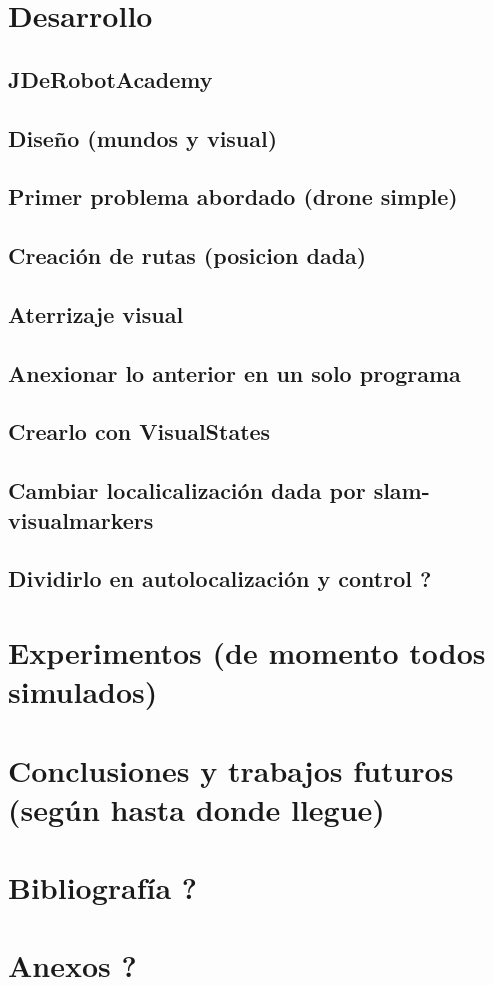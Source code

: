 \documentclass{book}
\begin{document}
\chapter{Desarrollo}
\section{JDeRobotAcademy}
\section{Diseño (mundos y visual)}
\section{Primer problema abordado (drone simple)}
\section{Creación de rutas (posicion dada)}
\section{Aterrizaje visual}
\section{Anexionar lo anterior en un solo programa}
\section{Crearlo con VisualStates}
\section{Cambiar localicalización dada por slam-visualmarkers}
\section{Dividirlo en autolocalización y control ?}

\chapter{Experimentos (de momento todos simulados)}

\chapter{Conclusiones y trabajos futuros (según hasta donde llegue)}

\chapter{Bibliografía ?}

\chapter{Anexos ?}
\end{document}
